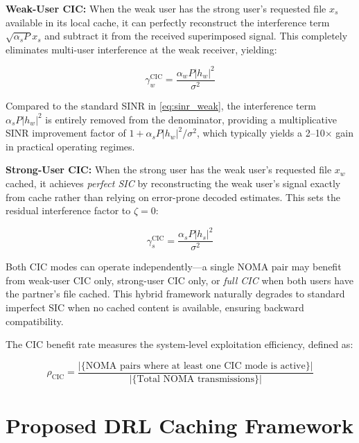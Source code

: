 \documentclass[conference]{IEEEtran}
\begin{document}
\textbf{Weak-User CIC:} When the weak user has the strong user's requested file $x_s$ available in its local cache, it can perfectly reconstruct the interference term $\sqrt{\alpha_s P} x_s$ and subtract it from the received superimposed signal. This completely eliminates multi-user interference at the weak receiver, yielding:

\begin{equation}
\gamma_w^{\text{CIC}} = \frac{\alpha_w P |h_w|^2}{\sigma^2}
\label{eq:sinr_weak_cic}
\end{equation}

Compared to the standard SINR in \eqref{eq:sinr_weak}, the interference term $\alpha_s P |h_w|^2$ is entirely removed from the denominator, providing a multiplicative SINR improvement factor of $1 + \alpha_s P |h_w|^2 / \sigma^2$, which typically yields a 2--10$\times$ gain in practical operating regimes.

\textbf{Strong-User CIC:} When the strong user has the weak user's requested file $x_w$ cached, it achieves \textit{perfect SIC} by reconstructing the weak user's signal exactly from cache rather than relying on error-prone decoded estimates. This sets the residual interference factor to $\zeta = 0$:

\begin{equation}
\gamma_s^{\text{CIC}} = \frac{\alpha_s P |h_s|^2}{\sigma^2}
\label{eq:sinr_strong_cic}
\end{equation}

Both CIC modes can operate independently---a single NOMA pair may benefit from weak-user CIC only, strong-user CIC only, or \textit{full CIC} when both users have the partner's file cached. This hybrid framework naturally degrades to standard imperfect SIC when no cached content is available, ensuring backward compatibility.

The CIC benefit rate measures the system-level exploitation efficiency, defined as:

\begin{equation}
\rho_{\text{CIC}} = \frac{|\{\text{NOMA pairs where at least one CIC mode is active}\}|}{|\{\text{Total NOMA transmissions}\}|}
\label{eq:cic_rate}
\end{equation}


\section{Proposed DRL Caching Framework}
\end{document}
